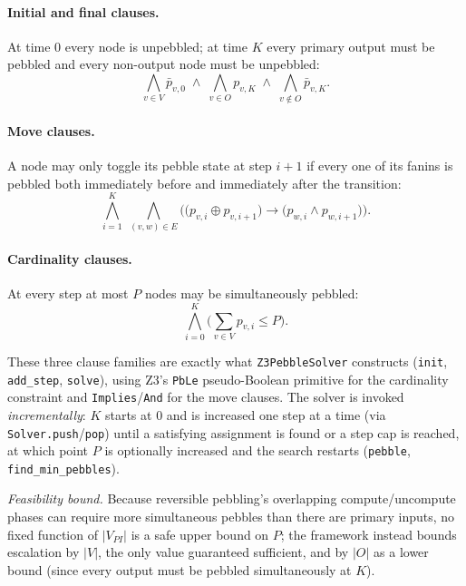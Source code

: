 \paragraph{Initial and final clauses.}
At time $0$ every node is unpebbled; at time $K$ every primary output
must be pebbled and every non-output node must be unpebbled:
\begin{equation}
\bigwedge_{v \in V} \bar p_{v,0}
\;\wedge\;
\bigwedge_{v \in O} p_{v,K}
\;\wedge\;
\bigwedge_{v \notin O} \bar p_{v,K}.
\end{equation}

\paragraph{Move clauses.}
A node may only toggle its pebble state at step $i+1$ if every one of
its fanins is pebbled both immediately before and immediately after
the transition:
\begin{equation}
\bigwedge_{i=1}^{K}\;\bigwedge_{(v,w)\in E}
\Big(\big(p_{v,i}\oplus p_{v,i+1}\big) \rightarrow
\big(p_{w,i}\wedge p_{w,i+1}\big)\Big).
\end{equation}

\paragraph{Cardinality clauses.}
At every step at most $P$ nodes may be simultaneously pebbled:
\begin{equation}
\bigwedge_{i=0}^{K}\Big(\sum_{v\in V} p_{v,i} \le P\Big).
\end{equation}

These three clause families are exactly what \texttt{Z3PebbleSolver}
constructs (\texttt{init}, \texttt{add\_step}, \texttt{solve}), using
Z3's \texttt{PbLe} pseudo-Boolean primitive for the cardinality
constraint and \texttt{Implies}/\texttt{And} for the move clauses. The
solver is invoked \emph{incrementally}: $K$ starts at $0$ and is
increased one step at a time (via \texttt{Solver.push}/\texttt{pop})
until a satisfying assignment is found or a step cap is reached, at
which point $P$ is optionally increased and the search restarts
(\texttt{pebble}, \texttt{find\_min\_pebbles}).

\emph{Feasibility bound.} Because reversible pebbling's overlapping
compute/uncompute phases can require more simultaneous pebbles than
there are primary inputs, no fixed function of $|V_{PI}|$ is a safe
upper bound on $P$; the framework instead bounds escalation by
$|V|$, the only value guaranteed sufficient, and by $|O|$ as a lower
bound (since every output must be pebbled simultaneously at $K$).

